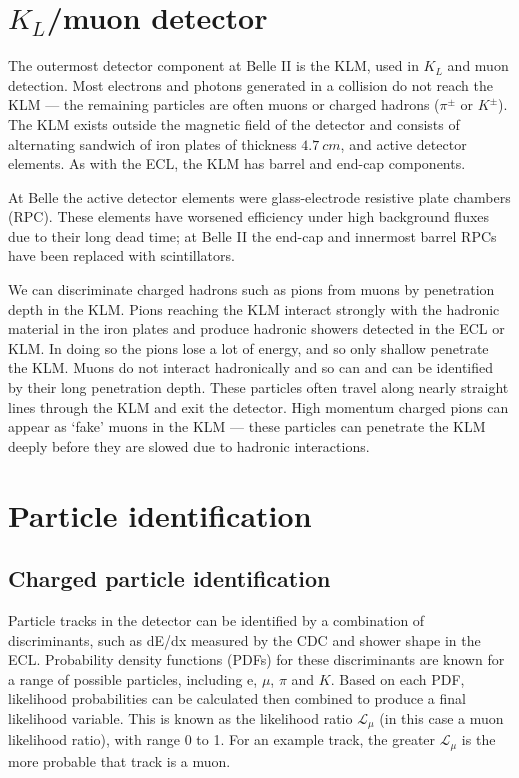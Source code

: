 \documentclass[12pt]{thesis}  %
\begin{document}

\section{$K_{L}$/muon detector}

The outermost detector component at Belle II is the KLM, used in $K_{L}$ and muon detection. Most electrons and photons generated in a collision do not reach the KLM --- the remaining particles are often muons or charged hadrons ($\pi^\pm$ or $K^\pm$). The KLM exists outside the magnetic field of the detector and consists of alternating sandwich of iron plates of thickness $\SI{4.7}{cm}$, and active detector elements. As with the ECL, the KLM has barrel and end-cap components.

At Belle the active detector elements were glass-electrode resistive plate chambers (RPC). These elements have worsened efficiency under high background fluxes due to their long dead time; at Belle II the end-cap and innermost barrel RPCs have been replaced with scintillators.

We can discriminate charged hadrons such as pions from muons by penetration depth in the KLM. Pions reaching the KLM interact strongly with the hadronic material in the iron plates and produce hadronic showers detected in the ECL or KLM. In doing so the pions lose a lot of energy, and so only shallow penetrate the KLM. Muons do not interact hadronically and so can and can be identified by their long penetration depth. These particles often travel along nearly straight lines through the KLM and exit the detector. High momentum charged pions can appear as `fake' muons in the KLM --- these particles can penetrate the KLM deeply before they are slowed due to hadronic interactions.




\section{Particle identification}
\label{sec:PID}

\subsection{Charged particle identification}

Particle tracks in the detector can be identified by a combination of discriminants, such as  dE/dx measured by the CDC and shower shape in the ECL. Probability density functions (PDFs) for these discriminants are known for a range of possible particles, including e, $\mu$, $\pi$ and $K$. Based on each PDF, likelihood probabilities can be calculated then combined to produce a final likelihood variable. This is known as the likelihood ratio $\mathcal{L}_{\mu}$ (in this case a muon likelihood ratio), with range 0 to 1. For an example track, the greater $\mathcal{L}_{\mu}$ is the more probable that track is a muon.
\end{document}
